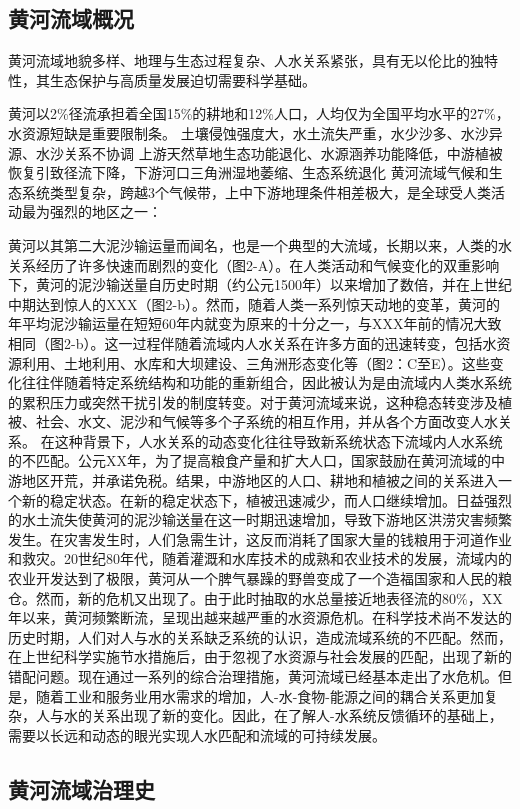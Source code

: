 
\subsection{黄河流域概况}

黄河流域地貌多样、地理与生态过程复杂、人水关系紧张，具有无以伦比的独特性，其生态保护与高质量发展迫切需要科学基础。

黄河以2\%径流承担着全国15\%的耕地和12\%人口，人均仅为全国平均水平的27\%，水资源短缺是重要限制条。
土壤侵蚀强度大，水土流失严重，水少沙多、水沙异源、水沙关系不协调
上游天然草地生态功能退化、水源涵养功能降低，中游植被恢复引致径流下降，下游河口三角洲湿地萎缩、生态系统退化
黄河流域气候和生态系统类型复杂，跨越3个气候带，上中下游地理条件相差极大，是全球受人类活动最为强烈的地区之一：


黄河以其第二大泥沙输运量而闻名，也是一个典型的大流域，长期以来，人类的水关系经历了许多快速而剧烈的变化（图2-A）。在人类活动和气候变化的双重影响下，黄河的泥沙输送量自历史时期（约公元1500年）以来增加了数倍，并在上世纪中期达到惊人的XXX（图2-b）。然而，随着人类一系列惊天动地的变革，黄河的年平均泥沙输运量在短短60年内就变为原来的十分之一，与XXX年前的情况大致相同（图2-b）。这一过程伴随着流域内人水关系在许多方面的迅速转变，包括水资源利用、土地利用、水库和大坝建设、三角洲形态变化等（图2：C至E）。这些变化往往伴随着特定系统结构和功能的重新组合，因此被认为是由流域内人类水系统的累积压力或突然干扰引发的制度转变。对于黄河流域来说，这种稳态转变涉及植被、社会、水文、泥沙和气候等多个子系统的相互作用，并从各个方面改变人水关系。
在这种背景下，人水关系的动态变化往往导致新系统状态下流域内人水系统的不匹配。公元XX年，为了提高粮食产量和扩大人口，国家鼓励在黄河流域的中游地区开荒，并承诺免税。结果，中游地区的人口、耕地和植被之间的关系进入一个新的稳定状态。在新的稳定状态下，植被迅速减少，而人口继续增加。日益强烈的水土流失使黄河的泥沙输送量在这一时期迅速增加，导致下游地区洪涝灾害频繁发生。在灾害发生时，人们急需生计，这反而消耗了国家大量的钱粮用于河道作业和救灾。20世纪80年代，随着灌溉和水库技术的成熟和农业技术的发展，流域内的农业开发达到了极限，黄河从一个脾气暴躁的野兽变成了一个造福国家和人民的粮仓。然而，新的危机又出现了。由于此时抽取的水总量接近地表径流的80\%，XX年以来，黄河频繁断流，呈现出越来越严重的水资源危机。在科学技术尚不发达的历史时期，人们对人与水的关系缺乏系统的认识，造成流域系统的不匹配。然而，在上世纪科学实施节水措施后，由于忽视了水资源与社会发展的匹配，出现了新的错配问题。现在通过一系列的综合治理措施，黄河流域已经基本走出了水危机。但是，随着工业和服务业用水需求的增加，人-水-食物-能源之间的耦合关系更加复杂，人与水的关系出现了新的变化。因此，在了解人-水系统反馈循环的基础上，需要以长远和动态的眼光实现人水匹配和流域的可持续发展。


\subsection{黄河流域治理史}

